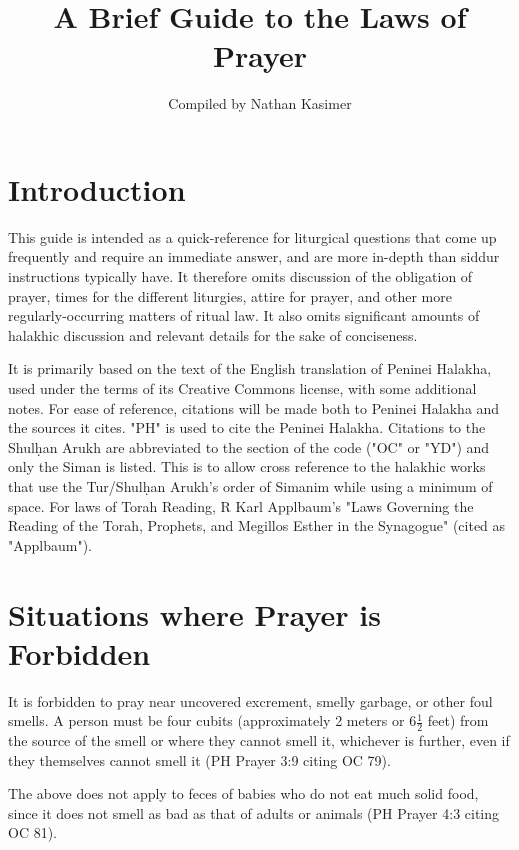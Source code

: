 \documentclass[11pt]{article}
\begin{document}
	
\title{A Brief Guide to the Laws of Prayer}

\author{Compiled by Nathan Kasimer}

\date{}

\maketitle


\section{Introduction}

This guide is intended as a quick-reference for liturgical questions that come up frequently and require an immediate answer, and are more in-depth than siddur instructions typically have. It therefore omits discussion of the obligation of prayer, times for the different liturgies, attire for prayer, and other more regularly-occurring matters of ritual law.  It also omits significant amounts of halakhic discussion and relevant details for the sake of conciseness.

It is primarily based on the text of the English translation of Peninei Halakha, used under the terms of its Creative Commons license, with some additional notes.  For ease of reference, citations will be made both to Peninei Halakha and the sources it cites.  "PH" is used to cite the Peninei Halakha.  Citations to the Shul\d{h}an Arukh are abbreviated to the section of the code ("OC" or "YD") and only the Siman is listed.  This is to allow cross reference to the halakhic works that use the Tur/Shul\d{h}an Arukh's order of Simanim while using a minimum of space.  For laws of Torah Reading, R Karl Applbaum's "Laws Governing the Reading of the Torah, Prophets, and Megillos Esther in the Synagogue" (cited as "Applbaum").

\section{Situations where Prayer is Forbidden}

It is forbidden to pray near uncovered excrement, smelly garbage, or other foul smells.  A person must be four cubits (approximately 2 meters or 6$\frac{1}{2}$ feet) from the source of the smell or where they cannot smell it, whichever is further, even if they themselves cannot smell it (PH Prayer 3:9 citing OC 79).

The above does not apply to feces of babies who do not eat much solid food, since it does not smell as bad as that of adults or animals (PH Prayer 4:3 citing OC 81).
\end{document}
